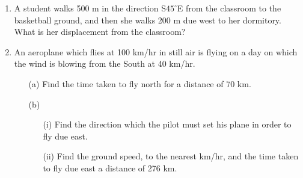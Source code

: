 \begin{enumerate}
	\item A student walks 500 m in the direction S$45^\circ$E from the classroom to the basketball ground, and then she walks 200 m due west to her dormitory. What is her displacement from the classroom?
	
	\item An aeroplane which flies at 100 km\slash hr in still air is flying on a day on which the wind is blowing from the South at 40 km\slash hr.
		\begin{itemize}
		\item[(a)] Find the time taken to fly north for a distance of 70 km.
		\item[(b)]
			\begin{itemize}
			\item[(i)] Find the direction which the pilot must set his plane in order to fly due east.
			\item[(ii)] Find the ground speed, to the nearest km\slash hr, and the time taken to fly due east a distance of 276 km.
			\end{itemize}
		\end{itemize}
		
	



\end{enumerate}	
	
	
	
	
